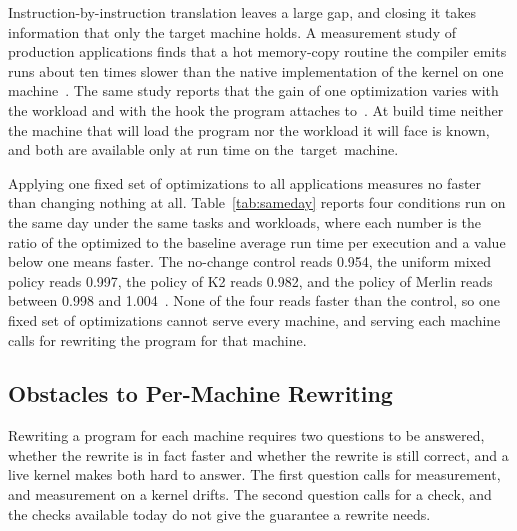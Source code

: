 Instruction-by-instruction translation leaves a large gap, and closing it takes information that only the target machine holds.
A measurement study of production applications finds that a hot memory-copy routine the compiler emits runs about ten times slower than the native implementation of the kernel on one machine~\cite{shahinfar2025demystifying}.
The same study reports that the gain of one optimization varies with the workload and with the hook the program attaches to~\cite{shahinfar2025demystifying}.
At build time neither the machine that will load the program nor the workload it will face is known, and both are available only at run time on the~target~machine.

Applying one fixed set of optimizations to all applications measures no faster than changing nothing at all.
Table~\ref{tab:sameday} reports four conditions run on the same day under the same tasks and workloads, where each number is the ratio of the optimized to the baseline average run time per execution and a value below one means faster.
The no-change control reads 0.954, the uniform mixed policy reads 0.997, the policy of K2 reads 0.982, and the policy of Merlin reads between 0.998 and 1.004~\cite{xu2021synthesizing,mao2024merlin}.
None of the four reads faster than the control, so one fixed set of optimizations cannot serve every machine, and serving each machine calls for rewriting the program for that machine.



\subsection{Obstacles to Per-Machine Rewriting}\label{sec:whynot}

Rewriting a program for each machine requires two questions to be answered, whether the rewrite is in fact faster and whether the rewrite is still correct, and a live kernel makes both hard to answer.
The first question calls for measurement, and measurement on a kernel drifts.
The second question calls for a check, and the checks available today do not give the guarantee a rewrite needs.

